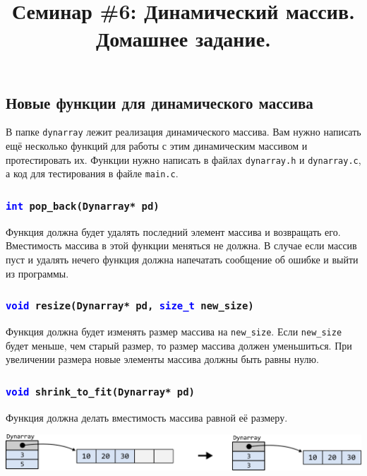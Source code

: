 \documentclass[10pt]{article}
\begin{document}
\title{Семинар \#6: Динамический массив. Домашнее задание.\vspace{-5ex}}\date{}\maketitle

\subsection{Новые функции для динамического массива}
В папке \texttt{dynarray} лежит реализация динамического массива. Вам нужно написать ещё несколько функций для работы с этим динамическим массивом и протестировать их. Функции нужно написать в файлах \texttt{dynarray.h} и \texttt{dynarray.c}, а код для тестирования в файле \texttt{main.c}.



\subsubsection{\texttt{\textcolor{blue}{int} pop\_back(Dynarray* pd)}}
Функция должна будет удалять последний элемент массива и возвращать его. Вместимость массива в этой функции меняться не должна. В случае если массив пуст и удалять нечего функция должна напечатать сообщение об ошибке и выйти из программы.


\subsubsection{\texttt{\textcolor{blue}{void} resize(Dynarray* pd, \textcolor{blue}{size\_t} new\_size)}}
Функция должна будет изменять размер массива на \texttt{new\_size}. Если \texttt{new\_size} будет меньше, чем старый размер, то размер массива должен уменьшиться. При увеличении размера новые элементы массива должны быть равны нулю.


\subsubsection{\texttt{\textcolor{blue}{void} shrink\_to\_fit(Dynarray* pd)}}
Функция должна делать вместимость массива равной её размеру.\\
\begin{center}
\includegraphics[scale=1]{../images/dynarray_shrink_to_fit.png}
\end{center}
\end{document}

